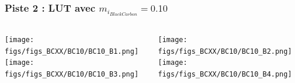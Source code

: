 \documentclass[8pt]{beamer}
\begin{document}
\begin{frame}
\frametitle{Piste 2 : LUT avec $m_{i_{Black Carbon}} = 0.10$}
	\begin{columns}
		\begin{column}{0.5\textwidth}
			\begin{center}
	     		\texttt{[image: figs/figs\_BCXX/BC10/BC10\_B1.png]}	
		     	\texttt{[image: figs/figs\_BCXX/BC10/BC10\_B3.png]}
		    \end{center}		
		    
		\end{column}
		\begin{column}{0.5\textwidth}
			\begin{center}
		     	\texttt{[image: figs/figs\_BCXX/BC10/BC10\_B2.png]}
		     	\texttt{[image: figs/figs\_BCXX/BC10/BC10\_B4.png]}
		    \end{center}				
		\end{column}
	\end{columns}
\end{frame}



\end{document}
